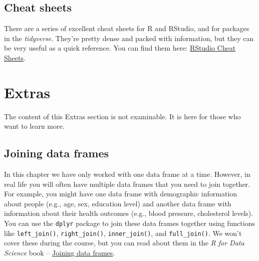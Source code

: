 \documentclass[
  letterpaper,
  8pt,
  a4paper]{book}
\begin{document}
\subsection*{Cheat sheets}\label{cheat-sheets}

There are a series of excellent cheat sheets for R and RStudio, and for
packages in the \emph{tidyverse}. They're pretty dense and packed with
information, but they can be very useful as a quick reference. You can
find them here: \href{https://posit.co/resources/cheatsheets/}{RStudio
Cheat Sheets}.

\section*{Extras}\label{extras}


\begin{tcolorbox}[enhanced jigsaw, arc=.35mm, bottomrule=.15mm, bottomtitle=1mm, breakable, colback=white, colbacktitle=quarto-callout-note-color!10!white, colframe=quarto-callout-note-color-frame, coltitle=black, left=2mm, leftrule=.75mm, opacityback=0, opacitybacktitle=0.6, rightrule=.15mm, title=\textcolor{quarto-callout-note-color}{\faInfo}\hspace{0.5em}{Note}, titlerule=0mm, toprule=.15mm, toptitle=1mm]

The content of this Extras section is not examinable. It is here for
those who want to learn more.

\end{tcolorbox}

\subsection*{Joining data frames}\label{joining-data-frames}

In this chapter we have only worked with one data frame at a time.
However, in real life you will often have multiple data frames that you
need to join together. For example, you might have one data frame with
demographic information about people (e.g., age, sex, education level)
and another data frame with information about their health outcomes
(e.g., blood pressure, cholesterol levels). You can use the
\texttt{dplyr} package to join these data frames together using
functions like \texttt{left\_join()}, \texttt{right\_join()},
\texttt{inner\_join()}, and \texttt{full\_join()}. We won't cover these
during the course, but you can read about them in the \emph{R for Data
Science} book -- \href{https://r4ds.hadley.nz/joins.html}{Joining data
frames}.
\end{document}
